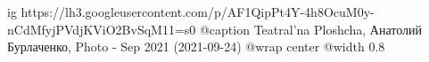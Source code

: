  
 
 
 
 

\ifcmt
  ig https://lh3.googleusercontent.com/p/AF1QipPt4Y-4h8OcuM0y-nCdMfyjPVdjKViO2BvSqM11=s0
	@caption Teatral'na Ploshcha, Анатолий Бурлаченко, Photo - Sep 2021 (2021-09-24)
  @wrap center
  @width 0.8
\fi
